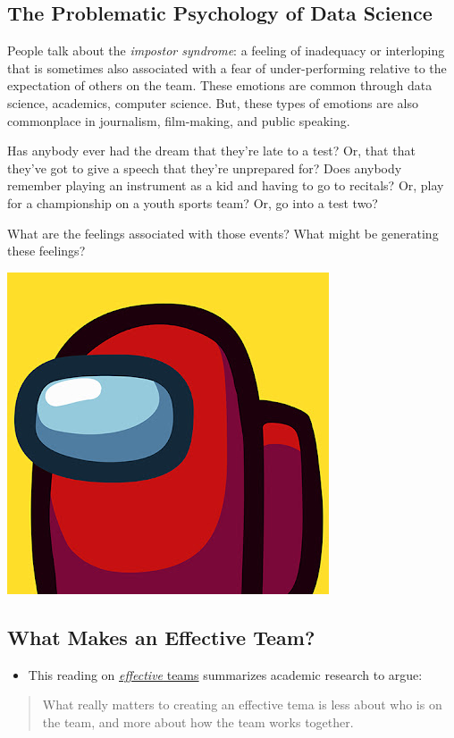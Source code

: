 \documentclass[
]{book}
\providecommand{\tightlist}{%
  \setlength{\itemsep}{0pt}\setlength{\parskip}{0pt}}
\theoremstyle{definition}
\theoremstyle{definition}
\theoremstyle{definition}
\theoremstyle{definition}
\theoremstyle{remark}
\begin{document}
\subsection{The Problematic Psychology of Data Science}\label{the-problematic-psychology-of-data-science}

People talk about the \emph{impostor syndrome}: a feeling of inadequacy or interloping that is sometimes also associated with a fear of under-performing relative to the expectation of others on the team. These emotions are common through data science, academics, computer science. But, these types of emotions are also commonplace in journalism, film-making, and public speaking.

Has anybody ever had the dream that they're late to a test? Or, that that they've got to give a speech that they're unprepared for? Does anybody remember playing an instrument as a kid and having to go to recitals? Or, play for a championship on a youth sports team? Or, go into a test two?

What are the feelings associated with those events? What might be generating these feelings?

\includegraphics[width=0.25\linewidth,height=\textheight,keepaspectratio]{images/among_us.jpeg}

\subsection{What Makes an Effective Team?}\label{what-makes-an-effective-team}

\begin{itemize}
\tightlist
\item
  This reading on \href{https://rework.withgoogle.com/print/guides/5721312655835136/}{\emph{effective} teams} summarizes academic research to argue:
\end{itemize}

\begin{quote}
What really matters to creating an effective tema is less about who is on the team, and more about how the team works together.
\end{quote}
\end{document}
